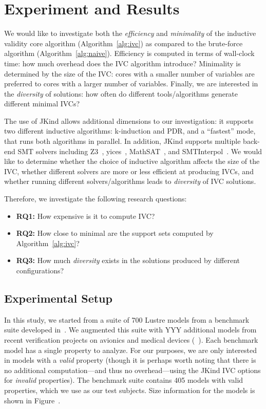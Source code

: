 \section{Experiment and Results}
\label{sec:exprm}


We would like to investigate both the {\em efficiency} and {\em minimality} of the inductive validity core algorithm (Algorithm~\ref{alg:ivc}) as compared to the brute-force algorithm (Algorithm~\ref{alg:naive}).  Efficiency is computed in terms of wall-clock time: how much overhead does the IVC algorithm introduce?  Minimality is determined by the size of the IVC: cores with a smaller number of variables are preferred to cores with a larger number of variables.  Finally, we are interested in the {\em diversity} of solutions: how often do different tools/algorithms generate different minimal IVCs?

The use of JKind allows additional dimensions to our investigation: it supports two different inductive algorithms: k-induction and PDR, and a ``fastest'' mode, that runs both algorithms in parallel.  In addition, JKind supports multiple back-end SMT solvers including Z3~\cite{DeMoura08:z3}, yices~\cite{Dutertre06:yices}, MathSAT~\cite{Cimatti2013:MathSAT}, and SMTInterpol~\cite{Christ2012:SMTInterpol}.  We would like to determine whether the choice of inductive algorithm affects the size of the IVC, whether different solvers are more or less efficient at producing IVCs, and whether running different solvers/algorithms leads to {\em diversity} of IVC solutions.

Therefore, we investigate the following research questions:
\begin{itemize}
    \item \textbf{RQ1:} How expensive is it to compute IVC?
    \item \textbf{RQ2:} How close to minimal are the support sets computed by Algorithm~\ref{alg:ivc}?
    \item \textbf{RQ3:} How much {\em diversity} exists in the solutions produced by different configurations?
\end{itemize}

\subsection{Experimental Setup}
In this study, we started from a suite of 700 Lustre models from a benchmark suite developed in~\cite{Hagen08:FMCAD}.  We augmented this suite with YYY additional models from recent verification projects on avionics and medical devices (~\cite{QFCS15:backes,hilt2013}).  
Each benchmark model has a single property to analyze.  For our purposes, we are only interested in models with a {\em valid} property (though it is perhaps worth noting that there is no additional computation---and thus no overhead---using the JKind IVC options for {\em invalid} properties).  The benchmark suite contains 405 models with valid properties, which we use as our test subjects.  Size information for the models is shown in Figure~.

